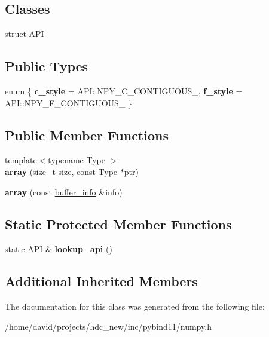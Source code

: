 \subsection*{Classes}
\begin{DoxyCompactItemize}
\item 
struct \hyperlink{structarray_1_1_a_p_i}{A\+PI}
\end{DoxyCompactItemize}
\subsection*{Public Types}
\begin{DoxyCompactItemize}
\item 
enum \{ {\bfseries c\+\_\+style} = A\+PI\+:\+:N\+P\+Y\+\_\+\+C\+\_\+\+C\+O\+N\+T\+I\+G\+U\+O\+U\+S\+\_\+, 
{\bfseries f\+\_\+style} = A\+PI\+:\+:N\+P\+Y\+\_\+\+F\+\_\+\+C\+O\+N\+T\+I\+G\+U\+O\+U\+S\+\_\+
 \}\hypertarget{classarray_a1f83fca3e2c14a4ba34983e5c05c947e}{}\label{classarray_a1f83fca3e2c14a4ba34983e5c05c947e}

\end{DoxyCompactItemize}
\subsection*{Public Member Functions}
\begin{DoxyCompactItemize}
\item 
{\footnotesize template$<$typename Type $>$ }\\{\bfseries array} (size\+\_\+t size, const Type $\ast$ptr)\hypertarget{classarray_a20c302056b41ca9c93e1bdf3d4595019}{}\label{classarray_a20c302056b41ca9c93e1bdf3d4595019}

\item 
{\bfseries array} (const \hyperlink{structbuffer__info}{buffer\+\_\+info} \&info)\hypertarget{classarray_afadb342ccfd398c0498ae62277d2a1a9}{}\label{classarray_afadb342ccfd398c0498ae62277d2a1a9}

\end{DoxyCompactItemize}
\subsection*{Static Protected Member Functions}
\begin{DoxyCompactItemize}
\item 
static \hyperlink{structarray_1_1_a_p_i}{A\+PI} \& {\bfseries lookup\+\_\+api} ()\hypertarget{classarray_aeaa2022c659b32c9fb4c339e96926c25}{}\label{classarray_aeaa2022c659b32c9fb4c339e96926c25}

\end{DoxyCompactItemize}
\subsection*{Additional Inherited Members}


The documentation for this class was generated from the following file\+:\begin{DoxyCompactItemize}
\item 
/home/david/projects/hdc\+\_\+new/inc/pybind11/numpy.\+h\end{DoxyCompactItemize}

